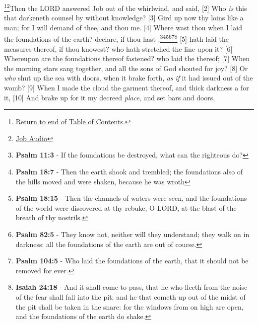 \footnote{\textcolor[cmyk]{0.99998,1,0,0}{\hyperlink{TOC}{Return to end of Table of Contents.}}}\footnote{\href{https://www.audioverse.org/english/audiobibles/books/ENGKJV/O/Job/1}{\textcolor[cmyk]{0.99998,1,0,0}{Job  Audio}}}\textcolor[cmyk]{0.99998,1,0,0}{Then the LORD answered Job out of the whirlwind, and said,}
[2] \textcolor[cmyk]{0.99998,1,0,0}{Who \emph{is} this that darkeneth counsel by  without knowledge?}
[3] \textcolor[cmyk]{0.99998,1,0,0}{Gird up now thy loins like a man; for I will demand of thee, and  thou me.}
[4] \textcolor[cmyk]{0.99998,1,0,0}{Where wast thou when I laid the foundations of the earth? declare, if thou hast .}\footnote{\textbf{Psalm 11:3} - If the foundations be destroyed, what can the righteous do?}\footnote{\textbf{Psalm 18:7} - Then the earth shook and trembled; the foundations also of the hills moved and were shaken, because he was wroth}\footnote{\textbf{Psalm 18:15} - Then the channels of waters were seen, and the foundations of the world were discovered at thy rebuke, O LORD, at the blast of the breath of thy nostrils.}\footnote{\textbf{Psalm 82:5} - They know not, neither will they understand; they walk on in darkness: all the foundations of the earth are out of course.}\footnote{\textbf{Psalm 104:5} - Who laid the foundations of the earth, that it should not be removed for ever.}\footnote{\textbf{Isaiah 24:18} - And it shall come to pass, that he who fleeth from the noise of the fear shall fall into the pit; and he that cometh up out of the midst of the pit shall be taken in the snare: for the windows from on high are open, and the foundations of the earth do shake.}
[5] \textcolor[cmyk]{0.99998,1,0,0}{ hath laid the measures thereof, if thou knowest?  who hath stretched the line upon it?}
[6] \textcolor[cmyk]{0.99998,1,0,0}{Whereupon are the foundations thereof fastened?  who laid the  thereof;}
[7] \textcolor[cmyk]{0.99998,1,0,0}{When the morning stars sang together, and all the sons of God shouted for joy?}
[8] \textcolor[cmyk]{0.99998,1,0,0}{Or \emph{who} shut up the sea with doors, when it brake forth, \emph{as} \emph{if} it had issued out of the womb?}
[9] \textcolor[cmyk]{0.99998,1,0,0}{When I made the cloud the garment thereof, and thick darkness a  for it,}
[10] \textcolor[cmyk]{0.99998,1,0,0}{And brake up for it my decreed \emph{place}, and set bars and doors,}
